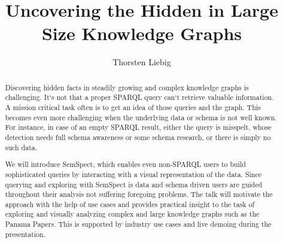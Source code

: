 \documentclass[runningheads,a4paper]{llncs}
\begin{document}
\mainmatter

\title{Uncovering the Hidden in Large Size Knowledge Graphs}
\author{Thorsten Liebig}

\maketitle

\begin{abstract}
Discovering hidden facts in steadily growing and complex knowledge graphs is challenging. It`s not that a proper SPARQL query can`t retrieve valuable information. A mission critical task often is to get an idea of those queries and the graph. This becomes even more challenging when the underlying data or schema is not well known. For instance, in case of an empty SPARQL result, either the query is misspelt, whose detection needs full schema awareness or some schema research, or there is simply no such data.

We will introduce SemSpect, which enables even non-SPARQL users to build sophisticated queries by interacting with a visual representation of the data. Since querying and exploring with SemSpect is data and schema driven users are guided throughout their analysis not suffering foregoing problems. The talk will motivate the approach with the help of use cases and provides practical insight to the task of exploring and visually analyzing complex and large knowledge graphs such as the Panama Papers. This is supported by industry use cases and live demoing during the presentation.

\end{abstract}
\end{document}
